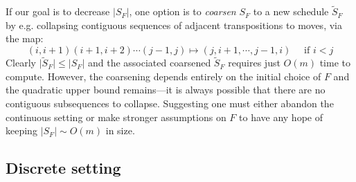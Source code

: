 \documentclass[sn-mathphys]{sn-jnl}
\begin{document}
If our goal is to decrease  $\lvert S_F \rvert$, one option is to \emph{coarsen} $S_F$ to a new schedule $\widetilde{S}_F$ by e.g. collapsing contiguous sequences of adjacent transpositions to moves, via the map:
\begin{equation}\label{eq:tr_to_mv}
	 (i, i+1)(i+1, i+2)\cdots(j-1, j) \mapsto (j, i+1, \cdots, j-1, i)  \quad \text{ if } i < j
\end{equation}
Clearly $\lvert \widetilde{S}_F \rvert \leq \lvert S_F \rvert$ and the associated coarsened $\widetilde{S}_F$ requires just $O(m)$ time to compute. However, the coarsening depends entirely on the initial choice of $F$ and the quadratic upper bound remains---it is always possible that there are no contiguous subsequences to collapse. 
Suggesting one must either abandon the continuous  setting or make stronger assumptions on $F$ to have any hope of keeping $\lvert S_F \rvert \sim O(m)$ in size.

\subsection{Discrete setting}\label{sec:moves_setting}

\end{document}
